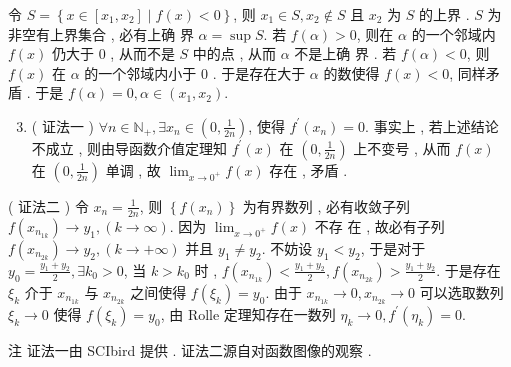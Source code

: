 \documentclass[10pt]{article}
\begin{document}
 令  $S=\left\{x \in\left[x_{1}, x_{2}\right] \mid f(x)<0\right\}$,  则  $x_{1} \in S, x_{2} \notin S$  且  $x_{2}$  为  $S$  的上界 . $S$  为非空有上界集合 ,  必有上确   界  $\alpha=\sup S$.  若  $f(\alpha)>0$,  则在  $\alpha$  的一个邻域内  $f(x)$  仍大于  0 ,  从而不是  $S$  中的点 ,  从而  $\alpha$  不是上确   界 .  若  $f(\alpha)<0$,  则  $f(x)$  在  $\alpha$  的一个邻域内小于  0 .  于是存在大于  $\alpha$  的数使得  $f(x)<0$,  同样矛盾 .  于是  $f(\alpha)=0, \alpha \in\left(x_{1}, x_{2}\right) .$

\begin{enumerate}
  \setcounter{enumi}{2}
  \item ( 证法一 ) $\forall n \in \mathbb{N}_{+}, \exists x_{n} \in\left(0, \frac{1}{2 n}\right)$,  使得  $f^{\prime}\left(x_{n}\right)=0$.  事实上 ,  若上述结论不成立 ,  则由导函数介值定理知  $f^{\prime}(x)$  在  $\left(0, \frac{1}{2 n}\right)$  上不变号 ,  从而  $f(x)$  在  $\left(0, \frac{1}{2 n}\right)$  单调 ,  故  $\lim _{x \rightarrow 0^{+}} f(x)$  存在 ,  矛盾 .
\end{enumerate}
( 证法二 )  令  $x_{n}=\frac{1}{2 n}$,  则  $\left\{f\left(x_{n}\right)\right\}$  为有界数列 ,  必有收敛子列  $f\left(x_{n_{1 k}}\right) \rightarrow y_{1},(k \rightarrow \infty)$.  因为  $\lim _{x \rightarrow 0^{+}} f(x)$  不存   在 ,  故必有子列  $f\left(x_{n_{2 k}}\right) \rightarrow y_{2},(k \rightarrow+\infty)$  并且  $y_{1} \neq y_{2}$.  不妨设  $y_{1}<y_{2}$,  于是对于  $y_{0}=\frac{y_{1}+y_{2}}{2}, \exists k_{0}>0$,  当  $k>k_{0}$  时 , $f\left(x_{n_{1 k}}\right)<\frac{y_{1}+y_{2}}{2}, f\left(x_{n_{2 k}}\right)>\frac{y_{1}+y_{2}}{2}$.  于是存在  $\xi_{k}$  介于  $x_{n_{1 k}}$  与  $x_{n_{2 k}}$  之间使得  $f\left(\xi_{k}\right)=y_{0}$.  由于  $x_{n_{1 k}} \rightarrow 0, x_{n_{2 k}} \rightarrow 0$  可以选取数列  $\xi_{k} \rightarrow 0$  使得  $f\left(\xi_{k}\right)=y_{0}$,  由  Rolle  定理知存在一数列  $\eta_{k} \rightarrow 0, f^{\prime}\left(\eta_{k}\right)=0$.

 注   证法一由  SCIbird  提供 .  证法二源自对函数图像的观察 .
\end{document}
